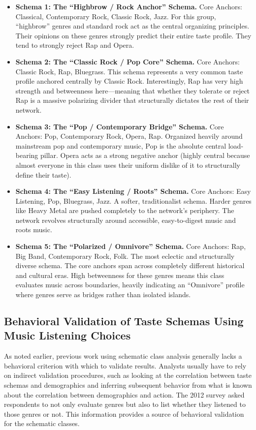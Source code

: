 \documentclass[preprint, authoryear,11pt, 3p]{elsarticle}
\begin{document}
\begin{itemize}
\item \textbf{Schema 1: The ``Highbrow / Rock Anchor'' Schema.} Core Anchors: Classical, Contemporary Rock, Classic Rock, Jazz. For this group, ``highbrow'' genres and standard rock act as the central organizing principles. Their opinions on these genres strongly predict their entire taste profile. They tend to strongly reject Rap and Opera.
\item \textbf{Schema 2: The ``Classic Rock / Pop Core'' Schema.} Core Anchors: Classic Rock, Rap, Bluegrass. This schema represents a very common taste profile anchored centrally by Classic Rock. Interestingly, Rap has very high strength and betweenness here---meaning that whether they tolerate or reject Rap is a massive polarizing divider that structurally dictates the rest of their network.
\item \textbf{Schema 3: The ``Pop / Contemporary Bridge'' Schema.} Core Anchors: Pop, Contemporary Rock, Opera, Rap. Organized heavily around mainstream pop and contemporary music, Pop is the absolute central load-bearing pillar. Opera acts as a strong negative anchor (highly central because almost everyone in this class uses their uniform dislike of it to structurally define their taste).
\item \textbf{Schema 4: The ``Easy Listening / Roots'' Schema.} Core Anchors: Easy Listening, Pop, Bluegrass, Jazz. A softer, traditionalist schema. Harder genres like Heavy Metal are pushed completely to the network's periphery. The network revolves structurally around accessible, easy-to-digest music and roots music.
\item \textbf{Schema 5: The ``Polarized / Omnivore'' Schema.} Core Anchors: Rap, Big Band, Contemporary Rock, Folk. The most eclectic and structurally diverse schema. The core anchors span across completely different historical and cultural eras. High betweenness for these genres means this class evaluates music across boundaries, heavily indicating an ``Omnivore'' profile where genres serve as bridges rather than isolated islands.
\end{itemize}

\subsection{Behavioral Validation of Taste Schemas Using Music Listening Choices}
As noted earlier, previous work using schematic class analysis generally lacks a behavioral criterion with which to validate results. Analysts usually have to rely on indirect validation procedures, such as looking at the correlation between taste schemas and demographics \citep{goldberg2011mapping, baldassarri2014neither} and inferring subsequent behavior from what is known about the correlation between demographics and action. The 2012 survey asked respondents to not only evaluate genres but also to list whether they listened to those genres or not. This information provides a source of behavioral validation for the schematic classes. 
\end{document}
